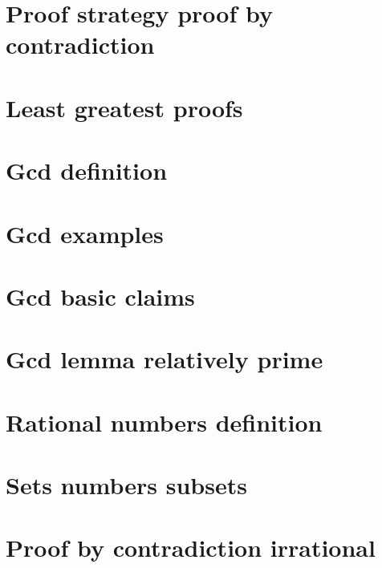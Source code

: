 \section*{Proof strategy proof by contradiction}

\vfill
\section*{Least greatest proofs}

\vfill
\section*{Gcd definition}

\vfill
\section*{Gcd examples}

\vfill
\section*{Gcd basic claims}

\vfill
\section*{Gcd lemma relatively prime}

\vfill
\section*{Rational numbers definition}

\vfill
\section*{Sets numbers subsets}

\vfill
\section*{Proof by contradiction irrational}

\vfill
